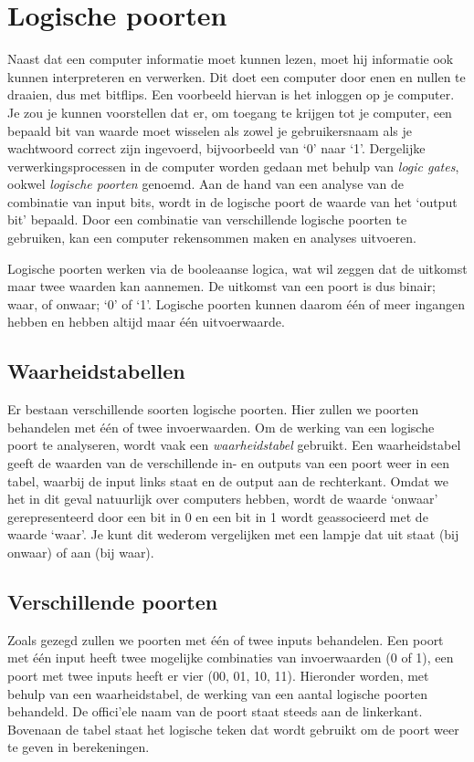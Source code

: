 \documentclass[10pt,a4paper,titlepage]{article}
\newcommand{\1}{\'{e}\'{e}n}
\begin{document}
\section*{Logische poorten}
Naast dat een computer informatie moet kunnen lezen, moet hij informatie ook kunnen interpreteren en verwerken. Dit doet een computer door enen en nullen te draaien, dus met bitflips. Een voorbeeld hiervan is het inloggen op je computer. Je zou je kunnen voorstellen dat er, om toegang te krijgen tot je computer, een bepaald bit van waarde moet wisselen als zowel je gebruikersnaam als je wachtwoord correct zijn ingevoerd, bijvoorbeeld van `0' naar `1'. Dergelijke verwerkingsprocessen in de computer worden gedaan met behulp van \emph{logic gates}, ookwel \emph{logische poorten} genoemd. Aan de hand van een analyse van de combinatie van input bits, wordt in de logische poort de waarde van het `output bit' bepaald. Door een combinatie van verschillende logische poorten te gebruiken, kan een computer rekensommen maken en analyses uitvoeren.

 
Logische poorten werken via de booleaanse logica, wat wil zeggen dat de uitkomst maar twee waarden kan aannemen. De uitkomst van een poort is dus binair; waar, of onwaar; `0' of `1'.   Logische poorten kunnen daarom \'{e}\'{e}n of meer ingangen hebben en hebben altijd maar \'{e}\'{e}n uitvoerwaarde. \\


\subsection*{Waarheidstabellen}
Er bestaan verschillende soorten logische poorten. Hier zullen we poorten behandelen met \'{e}\'{e}n of twee invoerwaarden. Om de werking van een logische poort te analyseren, wordt vaak een \emph{waarheidstabel} gebruikt. Een waarheidstabel geeft de waarden van de verschillende in- en outputs van een poort weer in een tabel, waarbij de input links staat en de output aan de rechterkant. Omdat we het in dit geval natuurlijk over computers hebben, wordt de waarde `onwaar' gerepresenteerd door een bit in 0 en een bit in 1 wordt geassocieerd met de waarde `waar'. Je kunt dit wederom vergelijken met een lampje dat uit staat (bij onwaar) of aan (bij waar).\\


\subsection*{Verschillende poorten}
Zoals gezegd zullen we poorten met \'{e}\'{e}n of twee inputs behandelen. Een poort met \'{e}\'{e}n input heeft twee mogelijke combinaties van invoerwaarden (0 of 1), een poort met twee inputs heeft er vier (00, 01, 10, 11). Hieronder worden, met behulp van een waarheidstabel, de werking van een aantal logische poorten behandeld. De offici'{e}le naam van de poort staat steeds aan de linkerkant. Bovenaan de tabel staat het logische teken dat wordt gebruikt om de poort weer te geven in berekeningen.
\end{document}
